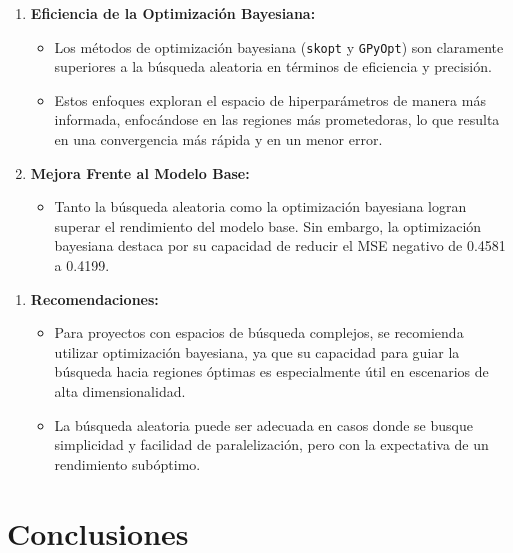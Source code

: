 \documentclass[
  12pt,
  letterpaper,
  DIV=11,
  numbers=noendperiod]{scrartcl}
\providecommand{\tightlist}{%
  \setlength{\itemsep}{0pt}\setlength{\parskip}{0pt}}\usepackage{longtable,booktabs,array}
\begin{document}
\begin{enumerate}
\def\labelenumi{\arabic{enumi}.}
\tightlist
\item
  \textbf{Eficiencia de la Optimización Bayesiana:}

  \begin{itemize}
  \tightlist
  \item
    Los métodos de optimización bayesiana (\texttt{skopt} y
    \texttt{GPyOpt}) son claramente superiores a la búsqueda aleatoria
    en términos de eficiencia y precisión.
  \item
    Estos enfoques exploran el espacio de hiperparámetros de manera más
    informada, enfocándose en las regiones más prometedoras, lo que
    resulta en una convergencia más rápida y en un menor error.
  \end{itemize}
\item
  \textbf{Mejora Frente al Modelo Base:}

  \begin{itemize}
  \tightlist
  \item
    Tanto la búsqueda aleatoria como la optimización bayesiana logran
    superar el rendimiento del modelo base. Sin embargo, la optimización
    bayesiana destaca por su capacidad de reducir el MSE negativo de
    0.4581 a 0.4199.
  \end{itemize}
\end{enumerate}

\newpage

\begin{enumerate}
\def\labelenumi{\arabic{enumi}.}
\setcounter{enumi}{2}
\tightlist
\item
  \textbf{Recomendaciones:}

  \begin{itemize}
  \tightlist
  \item
    Para proyectos con espacios de búsqueda complejos, se recomienda
    utilizar optimización bayesiana, ya que su capacidad para guiar la
    búsqueda hacia regiones óptimas es especialmente útil en escenarios
    de alta dimensionalidad.
  \item
    La búsqueda aleatoria puede ser adecuada en casos donde se busque
    simplicidad y facilidad de paralelización, pero con la expectativa
    de un rendimiento subóptimo.
  \end{itemize}
\end{enumerate}

\section{Conclusiones}\label{conclusiones}
\end{document}

